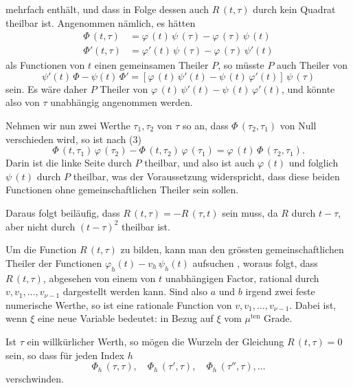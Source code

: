 
mehrfach enth\"alt, und dass in Folge dessen auch $R\,(t, \tau)$ durch
kein Quadrat theilbar ist. Angenommen n\"amlich, es h\"atten
\[
\begin{aligned}
\varPhi\,(t,\tau) &= \varphi\,(t)\,\psi\,(\tau) - \varphi\,(\tau)\,\psi\,(t) \\
\varPhi'(t,\tau) &= \varphi'(t)\,\psi\,(\tau) - \varphi\,(\tau)\,\psi'(t)
\end{aligned}
\]
als Functionen von $t$ einen gemeinsamen Theiler $P$, so m\"usste $P$
auch Theiler von
\[
\psi'(t)\,\varPhi - \psi(t)\,\varPhi' = [\varphi\,(t)\,\psi'(t) - \psi\,(t)\,\varphi'(t)]\,\psi\,(\tau)
\]
sein. Es w\"are daher $P$ Theiler von $\varphi\,(t)\,\psi'(t) - \psi\,(t)\,\varphi'(t)$, und
k\"onnte also von $\tau$ unabh\"angig angenommen werden.

Nehmen wir nun zwei Werthe $\tau_1, \tau_2$ von $\tau$ so an, dass
$\varPhi\,(\tau_2, \tau_1)$ von Null verschieden wird, so ist nach (3)
\[
\varPhi\,(t,\tau_1)\,\varphi\,(\tau_2) - \varPhi\,(t,\tau_2)\,\varphi\,(\tau_1) = \varphi\,(t)\,\varPhi\,(\tau_2,\tau_1).
\]
Darin ist die linke Seite durch $P$ theilbar, und also ist
auch $\varphi\,(t)$ und folglich $\psi\,(t)$ durch $P$ theilbar, was der Voraussetzung
 widerspricht, dass diese beiden Functionen ohne gemeinschaftlichen
 Theiler sein sollen.

Daraus folgt beil\"aufig, dass $R\,(t,\tau) = -R\,(\tau,t)$ sein muss,
da $R$ durch $t - \tau$, aber nicht durch $(t-\tau)^2$ theilbar ist.

Um die Function $R\,(t,\tau)$ zu bilden, kann man den gr\"ossten
gemeinschaftlichen Theiler der Functionen $\varphi_h(t) - v_h\,\psi_h(t)$ aufsuchen
, woraus folgt, dass $R\,(t,\tau)$, abgesehen von einem von $t$
unabh\"angigen Factor, rational durch $v, v_1, \ldots, v_{\nu-1}$ dargestellt
werden kann. Sind also $a$ und $b$ irgend zwei feste numerische
Werthe, so ist
eine rationale Function von $v, v_1, \ldots, v_{\nu-1}$. Dabei ist, wenn $\xi$
eine neue Variable bedeutet:
in Bezug auf $\xi$ vom $\mu^{\mathrm{ten}}$ Grade.

Ist $\tau$ ein willk\"urlicher Werth, so m\"ogen die Wurzeln der
Gleichung $R\,(t,\tau) = 0$
sein, so dass f\"ur jeden Index $h$
\[
\varPhi_h\,(\tau, \tau), \quad \varPhi_h\,(\tau', \tau), \quad \varPhi_h\,(\tau'', \tau), \ldots
\]
verschwinden.
